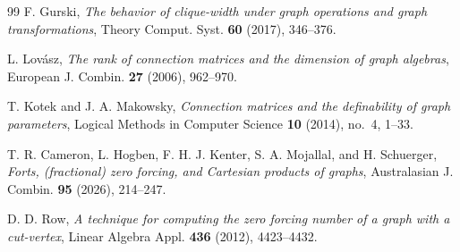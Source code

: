 \documentclass[11pt,reqno]{amsart}
\theoremstyle{definition}
\begin{document}
\begin{thebibliography}{99}
F. Gurski,
\emph{The behavior of clique-width under graph operations and graph transformations},
Theory Comput. Syst. \textbf{60} (2017), 346--376.

L. Lov\'asz,
\emph{The rank of connection matrices and the dimension of graph algebras},
European J. Combin. \textbf{27} (2006), 962--970.

T. Kotek and J. A. Makowsky,
\emph{Connection matrices and the definability of graph parameters},
Logical Methods in Computer Science \textbf{10} (2014), no.~4, 1--33.

T. R. Cameron, L. Hogben, F. H. J. Kenter, S. A. Mojallal, and H. Schuerger,
\emph{Forts, (fractional) zero forcing, and Cartesian products of graphs},
Australasian J. Combin. \textbf{95} (2026), 214--247.

D. D. Row,
\emph{A technique for computing the zero forcing number of a graph with a cut-vertex},
Linear Algebra Appl. \textbf{436} (2012), 4423--4432.

\end{thebibliography}
\end{document}
